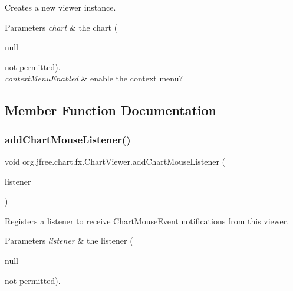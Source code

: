 Creates a new viewer instance.


\begin{DoxyParams}{Parameters}
{\em chart} & the chart (
\begin{DoxyCode}
null 
\end{DoxyCode}
 not permitted). \\
\hline
{\em context\+Menu\+Enabled} & enable the context menu? \\
\hline
\end{DoxyParams}


\subsection{Member Function Documentation}
\mbox{\label{classorg_1_1jfree_1_1chart_1_1fx_1_1_chart_viewer_a781fc0e11dd76743abfc0164be2e2732}} 
\subsubsection{\texorpdfstring{add\+Chart\+Mouse\+Listener()}{addChartMouseListener()}}
{\footnotesize\ttfamily void org.\+jfree.\+chart.\+fx.\+Chart\+Viewer.\+add\+Chart\+Mouse\+Listener (\begin{DoxyParamCaption}\item[{\mbox{\hyperlink{interfaceorg_1_1jfree_1_1chart_1_1fx_1_1interaction_1_1_chart_mouse_listener_f_x}{Chart\+Mouse\+Listener\+FX}}}]{listener }\end{DoxyParamCaption})}

Registers a listener to receive \mbox{\hyperlink{classorg_1_1jfree_1_1chart_1_1_chart_mouse_event}{Chart\+Mouse\+Event}} notifications from this viewer.


\begin{DoxyParams}{Parameters}
{\em listener} & the listener (
\begin{DoxyCode}
null 
\end{DoxyCode}
 not permitted). \\
\hline
\end{DoxyParams}
\mbox{\label{classorg_1_1jfree_1_1chart_1_1fx_1_1_chart_viewer_ab66028016a6de04fe52b66013545f0bc}} 
